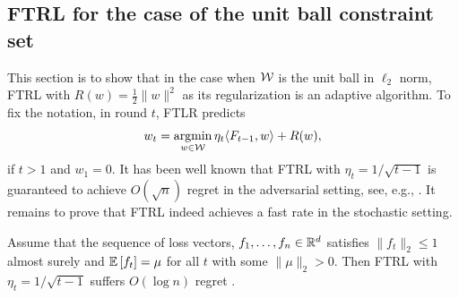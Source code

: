 \subsection{FTRL for the case of the unit ball constraint set}
This section is to show that in the case when $\mathcal{W}$ is the unit ball in $\ell_2$ norm, FTRL  with $R(w) = \frac{1}{2}\|w\|^2$ as its regularization is an adaptive algorithm. To fix the notation, in round $t$, FTLR predicts
\[
	w_{t} = \operatorname*{argmin}_{w\in \mathcal{W}} \eta_t \langle F_{t-1}, w\rangle + R(w), 
\]
if $t >1$ and $w_1=0$.
It has been well known that FTRL with $\eta_t = 1/\sqrt{t-1}$ is guaranteed to achieve $O(\sqrt{n})$ regret in the adversarial setting, see, e.g., \citep{SS12:Book}. It remains to prove that FTRL indeed achieves a fast rate in the stochastic setting. 
\begin{thm}
	Assume that the sequence of loss vectors, $f_1,\ldots,f_n \in \mathbb{R}^d$  satisfies $\|f_t\|_2 \le 1$ almost surely and $\mathbb{E}\left[ f_t \right] = \mu$ for all $t$ with some $\|\mu\|_2 >0$. Then FTRL with $\eta_t=1/\sqrt{t-1}$ suffers $O(\log n)$ regret .
\end{thm}

